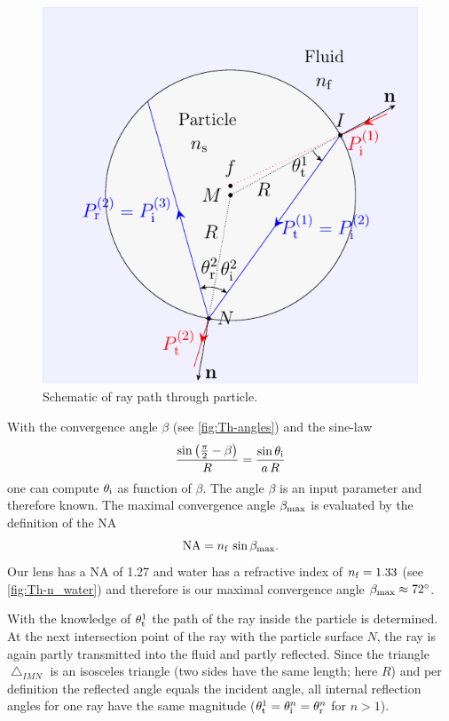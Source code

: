 \begin{figure}[thp]
  \centering
  \includegraphics[]{Plots/cache/ray.pdf}
  \caption{Schematic of ray path through particle.}
  \label{fig:Th-ray_particle}
\end{figure}

With the convergence angle $\beta$ (see \cref{fig:Th-angles}) and the sine-law
\begin{equation}
  \frac{\sin\left( \frac{\pi}{2}-\beta \right)}{R} = 
  \frac{\sin\theta_{\mathrm{i}}}{a\,R}
  \label{eq:Th-sine-law}
\end{equation}
one can compute $\theta_{\mathrm{i}}$ as function of $\beta$. The angle $\beta$ is an 
input parameter and therefore known. The maximal convergence angle 
$\beta_{\mathrm{max}}$ is evaluated by the definition of the NA
\begin{equation}
  \text{NA} = n_{\mathrm{f}}\,\sin\beta_{\mathrm{max}}.
  \label{eq:Th-NA}
\end{equation}
Our lens has a NA of 1.27 and water has a refractive index of $n_{\mathrm{f}}=1.33$ (see 
\cref{fig:Th-n_water}) and therefore is our maximal convergence angle 
$\beta_{\mathrm{max}} \approx \SI{72}{\degree}$.

With the knowledge of $\theta_{\mathrm{t}}^{1}$ the path of the ray inside the 
particle is determined. At the next intersection point of the ray with the 
particle surface $N$, the ray is again partly transmitted into the fluid and 
partly reflected. Since the triangle $\bigtriangleup_{IMN}$ is an isosceles 
triangle (two sides have the same length; here $R$) and per definition the 
reflected angle equals the incident angle, all internal reflection angles for 
one ray have the same magnitude 
($\theta_{\mathrm{t}}^{1}=\theta_{\mathrm{i}}^{n}=\theta_{\mathrm{r}}^{n}$ for $n>1$).

